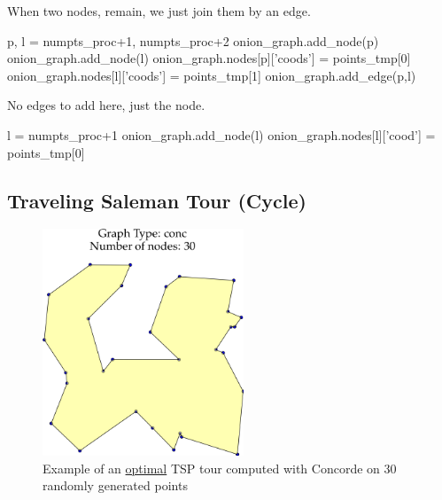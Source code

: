 When two nodes, remain, we just join them by an edge. 

\nwenddocs{}\endmoddef\nwstartdeflinemarkup{}\nwenddeflinemarkup
p, l = numpts_proc+1, numpts_proc+2
onion_graph.add_node(p)
onion_graph.add_node(l)
onion_graph.nodes[p]['coods'] = points_tmp[0]
onion_graph.nodes[l]['coods'] = points_tmp[1]
onion_graph.add_edge(p,l)
\nwendcode{}\nwdocspar

No edges to add here, just the node. 

\nwenddocs{}\endmoddef\nwstartdeflinemarkup{}\nwenddeflinemarkup
l = numpts_proc+1 
onion_graph.add_node(l)
onion_graph.nodes[l]['cood'] = points_tmp[0]
\nwendcode{}\nwdocspar




\subsection{Traveling Saleman Tour (Cycle)}

\begin{figure}[ht]
  \centering
  \includegraphics[width=6cm]{./miscimages/conc-example.png}
  \caption{\label{fig:tsp} Example of an \underline{optimal} TSP tour computed with Concorde  on 30 randomly generated points }
\end{figure}


